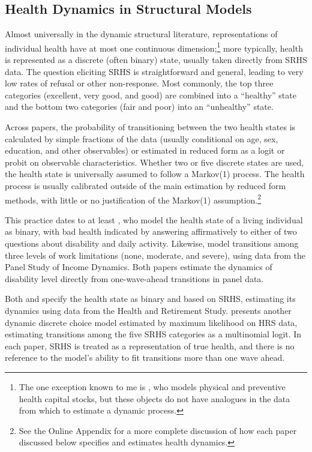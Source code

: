 \documentclass[12pt,pdftex,letterpaper]{article}
\begin{document}
\subsection{Health Dynamics in Structural Models}\label{sec:StructuralSRHS}

Almost universally in the dynamic structural literature, representations of individual health have at most one continuous dimension;\footnote{The one exception known to me is \cite{Ozkan17}, who models physical and preventive health capital stocks, but these objects do not have analogues in the data from which to estimate a dynamic process.} more typically, health is represented as a discrete (often binary) state, usually taken directly from SRHS data. The question eliciting SRHS is straightforward and general, leading to very low rates of refusal or other non-response.  Most commonly, the top three categories (excellent, very good, and good) are combined into a ``healthy'' state and the bottom two categories (fair and poor) into an ``unhealthy'' state.

Across papers, the probability of transitioning between the two health states is calculated by simple fractions of the data (usually conditional on age, sex, education, and other observables) or estimated in reduced form as a logit or probit on observable characteristics. Whether two or five discrete states are used, the health state is universally assumed to follow a Markov(1) process. The health process is usually calibrated outside of the main estimation by reduced form methods, with little or no justification of the Markov(1) assumption.\footnote{See the Online Appendix for a more complete discussion of how each paper discussed below specifies and estimates health dynamics.}

This practice dates to at least \cite{RustPhelan97}, who model the health state of a living individual as binary, with bad health indicated by answering affirmatively to either of two questions about disability and daily activity. Likewise, \cite{LowPistaferri15} model transitions among three levels of work limitations (none, moderate, and severe), using data from the Panel Study of Income Dynamics. Both papers estimate the dynamics of disability level directly from one-wave-ahead transitions in panel data.

Both \cite{BlauGilleskie06} and \cite{BlauGilleskie08} specify the health state as binary and based on SRHS, estimating its dynamics using data from the Health and Retirement Study. \cite{Khwaja10} presents another dynamic discrete choice model estimated by maximum likelihood on HRS data, estimating transitions among the five SRHS categories as a multinomial logit. In each paper, SRHS is treated as a representation of true health, and there is no reference to the model's ability to fit transitions more than one wave ahead.
\end{document}
